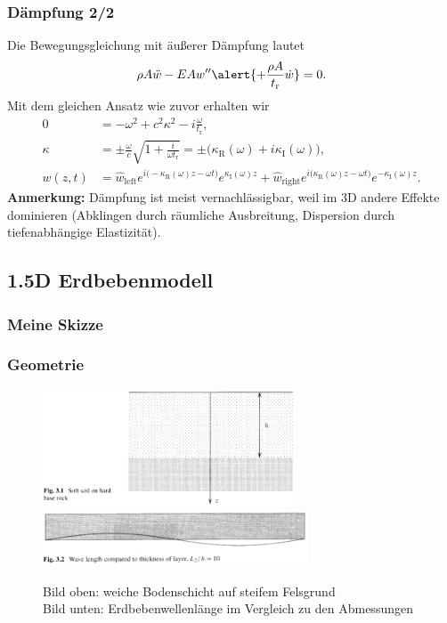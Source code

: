 \documentclass[hyperref={pdfpagemode=FullScreen, colorlinks=false}]{beamer}
\begin{document}
\begin{frame}
\frametitle{Dämpfung 2/2}
Die Bewegungsgleichung mit \alert{äußerer Dämpfung} lautet
\begin{equation*}
\rho A \ddot{w} - EA w'' \alert{+ \frac{\rho A}{t_\mathrm{r}}\dot{w}}=0.
\end{equation*}
Mit dem gleichen Ansatz wie zuvor erhalten wir
\begin{align*}
 0 &= -\omega^2+c^2\kappa^2-i\frac{\omega}{t_\mathrm{r}} , \\
\kappa &= \pm \frac{\omega}{c}\sqrt{1+\frac{i}{\omega t_\mathrm{r}}}=\pm\bigl(\kappa_\mathrm{R}(\omega)+i\kappa_\mathrm{I}(\omega)\bigr) , \\
w(z,t)&=\hat{w}_\mathrm{left}e^{i\bigl(-\kappa_\mathrm{R}(\omega) z-\omega t\bigr)}e^{\kappa_\mathrm{I}(\omega) z}
 +\hat{w}_\mathrm{right}e^{i\bigl(\kappa_\mathrm{R}(\omega) z-\omega t\bigr)}e^{-\kappa_\mathrm{I}(\omega) z} .
\end{align*}
\textbf{Anmerkung:} Dämpfung ist meist vernachlässigbar, weil im 3D andere Effekte dominieren (Abklingen durch räumliche Ausbreitung, Dispersion durch tiefenabhängige Elastizität). 
\end{frame}

\subsection{1.5D Erdbebenmodell}

\begin{frame}
\frametitle{Meine Skizze}


\end{frame}

\begin{frame}
\frametitle{Geometrie}

\begin{figure}
\includegraphics[width=0.67\textwidth]{fig_pdf/earthquake_model}
\includegraphics[width=0.7\textwidth]{fig_pdf/earthquake_length_ratio}
\caption*{Bild oben: weiche Bodenschicht auf steifem Felsgrund\\ Bild unten: Erdbebenwellenlänge im Vergleich zu den Abmessungen \cite{Verruijt2010}}
\end{figure}
\end{frame}
\end{document}
